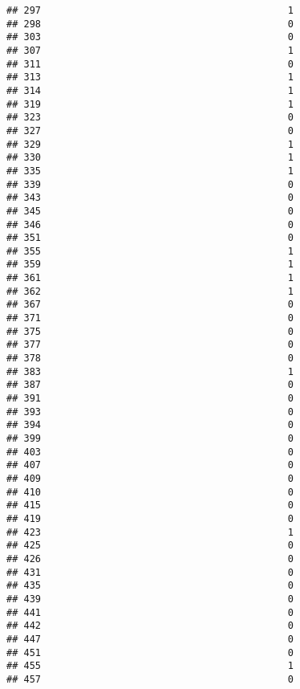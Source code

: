\documentclass[
]{article}
\begin{document}
\begin{verbatim}
## 297                                           1
## 298                                           0
## 303                                           0
## 307                                           1
## 311                                           0
## 313                                           1
## 314                                           1
## 319                                           1
## 323                                           0
## 327                                           0
## 329                                           1
## 330                                           1
## 335                                           1
## 339                                           0
## 343                                           0
## 345                                           0
## 346                                           0
## 351                                           0
## 355                                           1
## 359                                           1
## 361                                           1
## 362                                           1
## 367                                           0
## 371                                           0
## 375                                           0
## 377                                           0
## 378                                           0
## 383                                           1
## 387                                           0
## 391                                           0
## 393                                           0
## 394                                           0
## 399                                           0
## 403                                           0
## 407                                           0
## 409                                           0
## 410                                           0
## 415                                           0
## 419                                           0
## 423                                           1
## 425                                           0
## 426                                           0
## 431                                           0
## 435                                           0
## 439                                           0
## 441                                           0
## 442                                           0
## 447                                           0
## 451                                           0
## 455                                           1
## 457                                           0

\end{verbatim}
\end{document}
